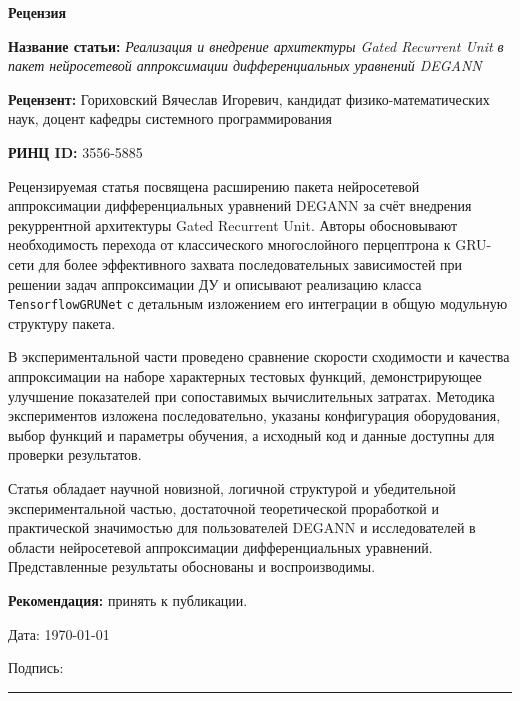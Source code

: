 \documentclass[a4paper,12pt]{article}
\begin{document}
\begin{center}
    {\LARGE \textbf{Рецензия}}
\end{center}

\vspace{1em}

\noindent
\textbf{Название статьи:} \emph{Реализация и внедрение архитектуры Gated Recurrent Unit в пакет нейросетевой аппроксимации дифференциальных уравнений DEGANN}

\noindent
\textbf{Рецензент:} Гориховский Вячеслав Игоревич, кандидат физико-математических наук, доцент кафедры системного программирования

\noindent
\textbf{РИНЦ ID:} 3556-5885

\vspace{1em}

Рецензируемая статья посвящена расширению пакета нейросетевой аппроксимации дифференциальных уравнений DEGANN за счёт внедрения рекуррентной архитектуры Gated Recurrent Unit. Авторы обосновывают необходимость перехода от классического многослойного перцептрона к GRU-сети для более эффективного захвата последовательных зависимостей при решении задач аппроксимации ДУ и описывают реализацию класса \texttt{TensorflowGRUNet} с детальным изложением его интеграции в общую модульную структуру пакета.

\vspace{0.5em}

В экспериментальной части проведено сравнение скорости сходимости и качества аппроксимации на наборе характерных тестовых функций, демонстрирующее улучшение показателей при сопоставимых вычислительных затратах. Методика экспериментов изложена последовательно, указаны конфигурация оборудования, выбор функций и параметры обучения, а исходный код и данные доступны для проверки результатов.

\vspace{0.5em}

Статья обладает научной новизной, логичной структурой и убедительной экспериментальной частью, достаточной теоретической проработкой и практической значимостью для пользователей DEGANN и исследователей в области нейросетевой аппроксимации дифференциальных уравнений. Представленные результаты обоснованы и воспроизводимы.

\vspace{1em}

\noindent
\textbf{Рекомендация:} принять к публикации.

\vfill

\noindent
\begin{minipage}[t]{0.45\textwidth}
Дата: \today
\end{minipage}%
\hfill
\begin{minipage}[t]{0.45\textwidth}
\raggedleft
Подпись: \rule{4cm}{0.4pt}
\end{minipage}
\end{document}
